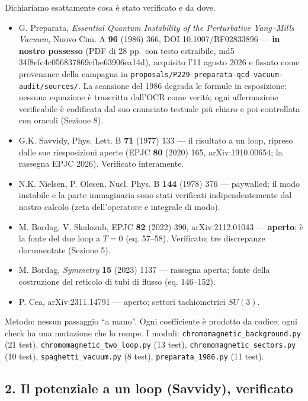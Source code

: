 \documentclass[
]{article}
\providecommand{\tightlist}{%
  \setlength{\itemsep}{0pt}\setlength{\parskip}{0pt}}
\begin{document}
Dichiariamo esattamente cosa è stato verificato e da dove.

\begin{itemize}
\tightlist
\item
  G. Preparata, \emph{Essential Quantum Instability of the Perturbative
  Yang--Mills Vacuum}, Nuovo Cim. A \textbf{96} (1986) 366, DOI
  10.1007/BF02833896 --- \textbf{in nostro possesso} (PDF di 28 pp.~con
  testo estraibile, md5 34f8efc4c056837869cfbe63906ea14d), acquisito
  l'11 agosto 2026 e fissato come provenance della campagna in
  \texttt{proposals/P229-preparata-qcd-vacuum-audit/sources/}. La
  scansione del 1986 degrada le formule in esposizione: nessuna
  equazione è trascritta dall'OCR come verità; ogni affermazione
  verificabile è codificata dal suo enunciato testuale più chiaro e poi
  controllata con oracoli (Sezione 8).
\item
  G.K. Savvidy, Phys. Lett. B \textbf{71} (1977) 133 --- il risultato a
  un loop, ripreso dalle sue riesposizioni aperte (EPJC \textbf{80}
  (2020) 165, arXiv:1910.00654; la rassegna EPJC 2026). Verificato
  interamente.
\item
  N.K. Nielsen, P. Olesen, Nucl. Phys. B \textbf{144} (1978) 376 ---
  paywalled; il modo instabile e la parte immaginaria sono stati
  verificati indipendentemente dal nostro calcolo (zeta dell'operatore e
  integrale di modo).
\item
  M. Bordag, V. Skalozub, EPJC \textbf{82} (2022) 390, arXiv:2112.01043
  --- \textbf{aperto}; è la fonte del due loop a \(T=0\) (eq. 57--58).
  Verificato; tre discrepanze documentate (Sezione 5).
\item
  M. Bordag, \emph{Symmetry} \textbf{15} (2023) 1137 --- rassegna
  aperta; fonte della costruzione del reticolo di tubi di flusso (eq.
  146--152).
\item
  P. Cea, arXiv:2311.14791 --- aperto; settori tachiometrici \(SU(3)\).
\end{itemize}

Metodo: nessun passaggio ``a mano''. Ogni coefficiente è prodotto da
codice; ogni check ha una mutazione che lo rompe. I moduli:
\texttt{chromomagnetic\_background.py} (21 test),
\texttt{chromomagnetic\_two\_loop.py} (13 test),
\texttt{chromomagnetic\_sectors.py} (10 test),
\texttt{spaghetti\_vacuum.py} (8 test), \texttt{preparata\_1986.py} (11
test).

\hypertarget{il-potenziale-a-un-loop-savvidy-verificato}{%
\subsection{2. Il potenziale a un loop (Savvidy),
verificato}\label{il-potenziale-a-un-loop-savvidy-verificato}}
\end{document}
